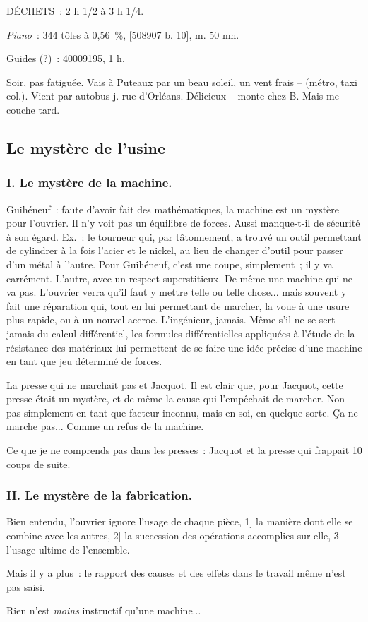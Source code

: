 \documentclass[french,twoside]{book} %
\begin{document}
DÉCHETS : 2 h 1/2 à 3 h 1/4.\par
{\itshape Piano} : 344 tôles à 0,56 \%, [508907 b. 10], m. 50 mn.\par
Guides (?) : 40009195, 1 h.\par
Soir, pas fatiguée. Vais à Puteaux par un beau soleil, un vent frais – (métro, taxi col.). Vient par autobus j. rue d'Orléans. Délicieux – monte chez B. Mais me couche tard.
\subsection[Le mystère de l'usine]{Le mystère de l'usine}
\noindent \par
\subsubsection[I. Le mystère de la machine.]{I. Le mystère de la machine.}
\noindent \par
\par
Guihéneuf : faute d'avoir fait des mathématiques, la machine est un mystère pour l'ouvrier. Il n'y voit pas un équilibre de forces. Aussi manque-t-il de sécurité à son égard. Ex. : le tourneur qui, par tâtonnement, a trouvé un outil permettant de cylindrer à la fois l'acier et le nickel, au lieu de changer d'outil pour passer d'un métal à l'autre. Pour Guihéneuf, c'est une coupe, simplement ; il y va carrément. L'autre, avec un respect superstitieux. De même une machine qui ne va pas. L'ouvrier verra qu'il faut y mettre telle ou telle chose... mais souvent y fait une réparation qui, tout en lui permettant de marcher, la voue à une usure plus rapide, ou à un nouvel accroc. L'ingénieur, jamais. Même s'il ne se sert jamais du calcul différentiel, les formules différentielles appliquées à l'étude de la résistance des matériaux lui permettent de se faire une idée précise d'une machine en tant que jeu déterminé de forces.\par
La presse qui ne marchait pas et Jacquot. Il est clair que, pour Jacquot, cette presse était un mystère, et de même la cause qui l'empêchait de marcher. Non pas simplement en tant que facteur inconnu, mais en soi, en quelque sorte. Ça ne marche pas... Comme un refus de la machine.\par
Ce que je ne comprends pas dans les presses : Jacquot et la presse qui frappait 10 coups de suite.
\subsubsection[II. Le mystère de la fabrication.]{II. Le mystère de la fabrication.}
\noindent \par
Bien entendu, l'ouvrier ignore l'usage de chaque pièce, 1] la manière dont elle se combine avec les autres, 2] la succession des opérations accomplies sur elle, 3] l'usage ultime de l'ensemble.\par
Mais il y a plus : le rapport des causes et des effets dans le travail même n'est pas saisi.\par
Rien n'est {\itshape moins} instructif qu'une machine...\par
\end{document}
